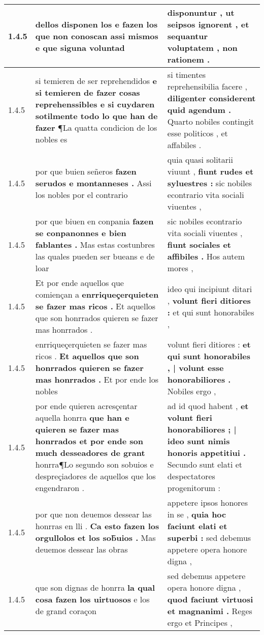 \begin{tabular}{|p{1cm}|p{6.5cm}|p{6.5cm}|}
1.4.5 & dellos disponen los \textbf{ e fazen los que non conoscan assi mismos } e que siguna voluntad & disponuntur , \textbf{ ut seipsos ignorent , } et sequantur voluptatem , non rationem . \\\hline
1.4.5 & si temieren de ser reprehendidos \textbf{ e si temieren de fazer cosas reprehenssibles e si cuydaren sotilmente todo lo que han de fazer } ¶La quatta condicion de los nobles es & si timentes reprehensibilia facere , \textbf{ diligenter considerent quid agendum . } Quarto nobiles contingit esse politicos , et affabiles . \\\hline
1.4.5 & por que buien señeros \textbf{ fazen serudos e montanneses . } Assi los nobles por el contrario & quia quasi solitarii viuunt , \textbf{ fiunt rudes et syluestres : } sic nobiles econtrario vita sociali viuentes , \\\hline
1.4.5 & por que biuen en conpania \textbf{ fazen se conpanonnes e bien fablantes . } Mas estas costunbres las quales pueden ser bueans e de loar & sic nobiles econtrario vita sociali viuentes , \textbf{ fiunt sociales et affibiles . } Hos autem mores , \\\hline
1.4.5 & Et por ende aquellos que comiençan a \textbf{ enrriqueçerquieten se fazer mas ricos . } Et aquellos que son honrrados quieren se fazer mas honrrados . & ideo qui incipiunt ditari , \textbf{ volunt fieri ditiores : } et qui sunt honorabiles , \\\hline
1.4.5 & enrriqueçerquieten se fazer mas ricos . \textbf{ Et aquellos que son honrrados quieren se fazer mas honrrados . } Et por ende los nobles & volunt fieri ditiores : \textbf{ et qui sunt honorabiles , | volunt esse honorabiliores . } Nobiles ergo , \\\hline
1.4.5 & por ende quieren acresçentar aquella honrra \textbf{ que han e quieren se fazer mas honrrados et por ende son much desseadores de grant } honrra¶Lo segundo son sobuios e despreçiadores de aquellos que los engendraron . & ad id quod habent , \textbf{ et volunt fieri honorabiliores ; | ideo sunt nimis honoris appetitiui . } Secundo sunt elati et despectatores progenitorum : \\\hline
1.4.5 & por que non deuemos dessear las honrras en lli . \textbf{ Ca esto fazen los orgullolos et los sob̃uios . } Mas deuemos dessear las obras & appetere ipsos honores in se , \textbf{ quia hoc faciunt elati et superbi : } sed debemus appetere opera honore digna , \\\hline
1.4.5 & que son dignas de honrra \textbf{ la qual cosa fazen los uirtuosos } e los de grand coraçon & sed debemus appetere opera honore digna , \textbf{ quod faciunt virtuosi et magnanimi . } Reges ergo et Principes , \\\hline

\end{tabular}
